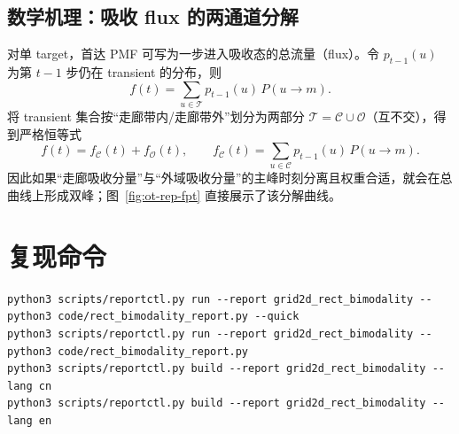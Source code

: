 \documentclass[11pt,fontset=fandol]{ctexart}
\begin{document}
\subsection{数学机理：吸收 flux 的两通道分解}
对单 target，首达 PMF 可写为一步进入吸收态的总流量（flux）。令 $p_{t-1}(u)$ 为第 $t-1$ 步仍在 transient 的分布，则
\[
f(t)=\sum_{u\in\mathcal T} p_{t-1}(u)\,P(u\to m).
\]
将 transient 集合按“走廊带内/走廊带外”划分为两部分 $\mathcal T=\mathcal C\cup\mathcal O$（互不交），得到严格恒等式
\[
f(t)=f_{\mathcal C}(t)+f_{\mathcal O}(t),\qquad
f_{\mathcal C}(t)=\sum_{u\in\mathcal C} p_{t-1}(u)\,P(u\to m).
\]
因此如果“走廊吸收分量”与“外域吸收分量”的主峰时刻分离且权重合适，就会在总曲线上形成双峰；图~\ref{fig:ot-rep-fpt} 直接展示了该分解曲线。

\section*{复现命令}
\begin{verbatim}
python3 scripts/reportctl.py run --report grid2d_rect_bimodality -- python3 code/rect_bimodality_report.py --quick
python3 scripts/reportctl.py run --report grid2d_rect_bimodality -- python3 code/rect_bimodality_report.py
python3 scripts/reportctl.py build --report grid2d_rect_bimodality --lang cn
python3 scripts/reportctl.py build --report grid2d_rect_bimodality --lang en
\end{verbatim}
\end{document}
